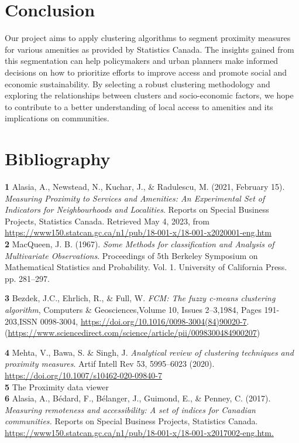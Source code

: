 \documentclass[11pt, a4paper]{article}
\begin{document}
\section*{Conclusion}


Our project aims to apply clustering algorithms to segment proximity measures for various amenities as provided by Statistics Canada. The insights gained from this segmentation can help policymakers and urban planners make informed decisions on how to prioritize efforts to improve access and promote social and economic sustainability. By selecting a robust clustering methodology and exploring the relationships between clusters and socio-economic factors, we hope to contribute to a better understanding of local access to amenities and its implications on communities.






\section*{Bibliography}


\noindent\textbf{1} Alasia, A., Newstead, N., Kuchar, J., \& Radulescu, M. (2021, February 15). \textit{Measuring Proximity to Services and Amenities: An Experimental Set of Indicators for Neighbourhoods and Localities}. Reports on Special Business Projects, Statistics Canada. Retrieved May 4, 2023, from \sloppy\url{https://www150.statcan.gc.ca/n1/pub/18-001-x/18-001-x2020001-eng.htm}  \\

\noindent\textbf{2} MacQueen, J. B. (1967). \textit{Some Methods for classification and Analysis of Multivariate Observations}. Proceedings of 5th Berkeley Symposium on Mathematical Statistics and Probability. Vol. 1. University of California Press. pp. 281–297.

\noindent\textbf{3} Bezdek, J.C., Ehrlich, R., \& Full, W. \textit{FCM: The fuzzy c-means clustering algorithm}, Computers \& Geosciences,Volume 10, Issues 2–3,1984, Pages 191-203,ISSN 0098-3004, \sloppy\url{https://doi.org/10.1016/0098-3004(84)90020-7}.(\sloppy\url{https://www.sciencedirect.com/science/article/pii/0098300484900207})

\noindent\textbf{4} Mehta, V., Bawa, S. \& Singh, J. \textit{Analytical review of clustering techniques and proximity measures}. Artif Intell Rev 53, 5995–6023 (2020). \sloppy\url{https://doi.org/10.1007/s10462-020-09840-7} \\

\noindent\textbf{5} The Proximity data viewer\\

\noindent\textbf{6} Alasia, A., Bédard, F., Bélanger, J., Guimond, E., \& Penney, C. (2017). \textit{Measuring remoteness and accessibility: A set of indices for Canadian communities.} Reports on Special Business Projects, Statistics Canada. \sloppy\url{https://www150.statcan.gc.ca/n1/pub/18-001-x/18-001-x2017002-eng.htm.}\\
\end{document}
